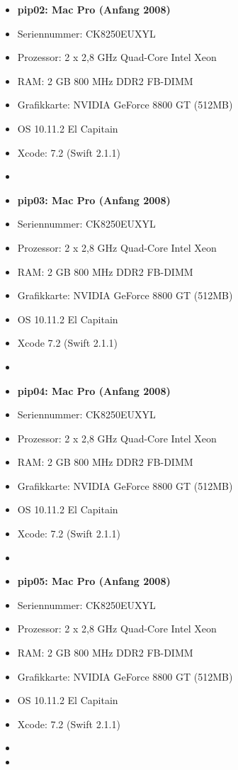 \begin{itemize}
	\item[] \textbf{pip02: Mac Pro (Anfang 2008)}
	\item[] Seriennummer: CK8250EUXYL
	\item[] Prozessor: 	2 x 2,8 GHz Quad-Core Intel Xeon 
	\item[] RAM: 		2 GB 800 MHz DDR2 FB-DIMM
	\item[] Grafikkarte: 	NVIDIA GeForce 8800 GT (512MB)
	\item[] OS 10.11.2 El Capitain
	\item[] Xcode: 		7.2 (Swift 2.1.1) 
	\item[] 
	\item[] \textbf{pip03: Mac Pro (Anfang 2008)}
	\item[] Seriennummer: CK8250EUXYL
	\item[] Prozessor: 	2 x 2,8 GHz Quad-Core Intel Xeon 
	\item[] RAM: 2 GB 800 MHz DDR2 FB-DIMM
	\item[] Grafikkarte: 	NVIDIA GeForce 8800 GT (512MB)
	\item[] OS 10.11.2 El Capitain
	\item[] Xcode 7.2 (Swift 2.1.1) 
	\item[] 
\item[]\textbf{pip04: Mac Pro (Anfang 2008) }
\item[]Seriennummer: CK8250EUXYL
\item[]Prozessor: 	2 x 2,8 GHz Quad-Core Intel Xeon 
\item[]RAM: 		2 GB 800 MHz DDR2 FB-DIMM
\item[]Grafikkarte: 	NVIDIA GeForce 8800 GT  (512MB)
	\item[] OS 10.11.2 El Capitain
\item[]Xcode: 		7.2 (Swift 2.1.1) 
\item[]
\item[]\textbf{pip05: Mac Pro (Anfang 2008)}
\item[]Seriennummer: CK8250EUXYL
\item[]Prozessor: 	2 x 2,8 GHz Quad-Core Intel Xeon 
\item[]RAM: 		2 GB 800 MHz DDR2 FB-DIMM
\item[]Grafikkarte: 	NVIDIA GeForce 8800 GT  (512MB)
	\item[] OS 10.11.2 El Capitain
\item[]Xcode: 		7.2 (Swift 2.1.1) 
\item[]
	\item[] 

\end{itemize}

